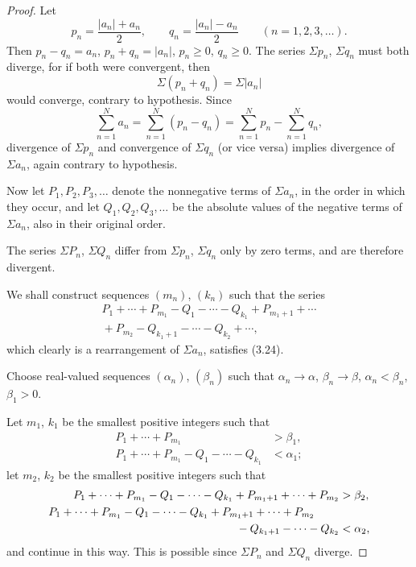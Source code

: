\begin{proof}
Let
\[ p_n = \frac{|a_n|+a_n}{2}, \qquad q_n = \frac{|a_n|-a_n}{2}
   \qquad (n = 1,2,3,\dots). \]
Then $p_n - q_n = a_n$, $p_n + q_n = |a_n|$, $p_n \ge 0$, $q_n \ge 0$. The
series $\Sigma p_n$, $\Sigma q_n$ must both diverge, for if both were
convergent, then
\[ \Sigma(p_n+q_n) = \Sigma|a_n| \]
would converge, contrary to hypothesis. Since
\[ \sum_{n=1}^{N} a_n = \sum_{n=1}^{N} (p_n-q_n)
   = \sum_{n=1}^{N} p_n - \sum_{n=1}^{N} q_n, \]
divergence of $\Sigma p_n$ and convergence of $\Sigma q_n$ (or vice versa)
implies divergence of $\Sigma a_n$, again contrary to
hypothesis.

Now let $P_1, P_2, P_3, \dots$ denote the nonnegative terms of $\Sigma a_n$,
in the order in which they occur, and let $Q_1, Q_2, Q_3, \dots$ be the
absolute values of the negative terms of $\Sigma a_n$, also in their original
order.

The series $\Sigma P_n$, $\Sigma Q_n$ differ from $\Sigma p_n$, $\Sigma q_n$
only by zero terms, and are therefore divergent.

We shall construct sequences $(m_n)$, $(k_n)$ such that the series
\begin{equation}
\begin{split}
  P_1 + \cdots + P_{m_1} - Q_1 - \cdots - Q_{k_1} + P_{m_1+1} + \cdots\\
  {}+ P_{m_2} - Q_{k_1+1} - \cdots - Q_{k_2} + \cdots,
\end{split}
\tag{3.25}
\end{equation}
which clearly is a rearrangement of $\Sigma a_n$, satisfies (3.24).

Choose real-valued sequences $(\alpha_n)$, $(\beta_n)$ such that
$\alpha_n \to \alpha$, $\beta_n \to \beta$, $\alpha_n < \beta_n$,
$\beta_1 > 0$.

Let $m_1$, $k_1$ be the smallest positive integers such that
\begin{align*}
  P_1 + \cdots + P_{m_1} &> \beta_1,\\
  P_1 + \cdots + P_{m_1} - Q_1 - \cdots - Q_{k_1} &< \alpha_1;
\end{align*}
let $m_2$, $k_2$ be the smallest positive integers such that
\begin{align*}
  P_1 + \cdots + P_{m_1} - Q_1 - \cdots - Q_{k_1} + P_{m_1+1} + \cdots
    + P_{m_2} &> \beta_2,\\
  P_1 + \cdots + P_{m_1} - Q_1 - \cdots - Q_{k_1} + P_{m_1+1} + \cdots
    + P_{m_2}\hspace{2.2em}&\\
  {}- Q_{k_1+1} - \cdots - Q_{k_2} &< \alpha_2,
\end{align*}
and continue in this way. This is possible since $\Sigma P_n$ and $\Sigma Q_n$
diverge.


\end{proof}
